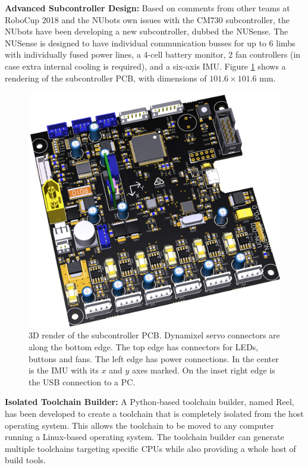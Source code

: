 \documentclass{llncs}
\begin{document}
\noindent\textbf{Advanced Subcontroller Design:}
Based on comments from other teams at RoboCup 2018 and the NUbots own issues with the CM730 subcontroller, the NUbots have been developing a new subcontroller, dubbed the NUSense. The NUSense is designed to have individual communication busses for up to 6 limbs with individually fused power lines, a 4-cell battery monitor, 2 fan controllers (in case extra internal cooling is required), and a six-axis IMU. Figure \ref{fig:nusense} shows a rendering of the subcontroller PCB, with dimensions of $101.6\times 101.6\textrm{ mm}$. \\

\begin{figure}[h!]
    \centering
    \includegraphics[width=0.80\linewidth]{NUSense3D.png}
    \caption{3D render of the subcontroller PCB. Dynamixel servo connectors are along the bottom edge. The top edge has connectors for LEDs, buttons and fans. The left edge has power connections. In the center is the IMU with its $x$ and $y$ axes marked. On the inset right edge is the USB connection to a PC.}
    \label{fig:nusense}
\end{figure}


\noindent\textbf{Isolated Toolchain Builder:}
A Python-based toolchain builder, named Reel, has been developed to create a toolchain that is completely isolated from the host operating system. This allows the toolchain to be moved to any computer running a Linux-based operating system. The toolchain builder can generate multiple toolchains targeting specific CPUs while also providing a whole host of build tools. \\
\end{document}

